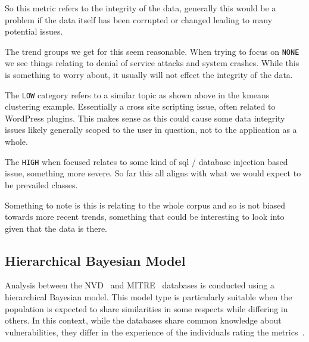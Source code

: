 \documentclass[12pt]{article}
\begin{document}
So this metric refers to the integrity of the data, generally this would be a problem if the data
itself has been corrupted or changed leading to many potential issues.

The trend groups we get for this seem reasonable. When trying to focus on \texttt{NONE} we see things relating
to denial of service attacks and system crashes. While this is something to worry about, it usually
will not effect the integrity of the data.

The \texttt{LOW} category refers to a similar topic as shown above in the kmeans clustering example.
Essentially a cross site scripting issue, often related to WordPress plugins. This makes sense as
this could cause some data integrity issues likely generally scoped to the user in question, not to
the application as a whole.

The \texttt{HIGH} when focused relates to some kind of sql / database injection based issue,
something more severe. So far this all aligns with what we would expect to be prevailed classes.

Something to note is this is relating to the whole corpus and so is not biased towards more recent
trends, something that could be interesting to look into given that the data is there.







\subsection{Hierarchical Bayesian Model} \label{bayesian_modeling}

Analysis between the NVD~\cite{NVD} and MITRE~\cite{MITRE} databases is conducted using a
hierarchical Bayesian model. This model type is particularly suitable when the population is
expected to share similarities in some respects while differing in others. In this context, while
the databases share common knowledge about vulnerabilities, they differ in the experience of the
individuals rating the metrics~\cite{bayes}.
\end{document}
